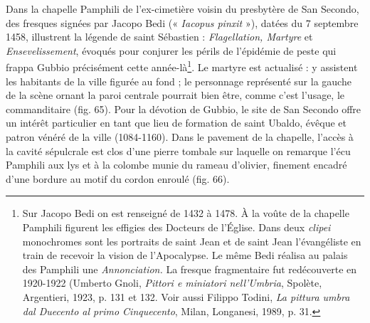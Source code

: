 \documentclass[12pt,twoside,openany]{book}
\begin{document}
Dans la chapelle Pamphili de l’ex-cimetière voisin du presbytère de San Secondo, des fresques signées par Jacopo Bedi (« \textit{Iacopus pinxit} »), datées du 7 septembre 1458, illustrent la légende de saint Sébastien :\textit{ Flagellation, Martyre }et \textit{Ensevelissement}, évoqués pour conjurer les périls de l’épidémie de peste qui frappa Gubbio précisément cette année-là\footnote{Sur Jacopo Bedi on est renseigné de 1432 à 1478. À la voûte de la chapelle Pamphili figurent les effigies des Docteurs de l’Église. Dans deux \textit{clipei} monochromes sont les portraits de saint Jean et de saint Jean l’évangéliste en train de recevoir la vision de l’Apocalypse. Le même Bedi réalisa au palais des Pamphili une \textit{Annonciation. }La fresque fragmentaire fut redécouverte en 1920-1922 (Umberto Gnoli, \textit{Pittori e miniatori nell'Umbria}, Spolète, Argentieri, 1923, p. 131 et 132. Voir aussi Filippo Todini, \textit{La pittura umbra dal Duecento al primo Cinquecento}, Milan, Longanesi, 1989, p. 31.}. Le martyre est actualisé : y assistent les habitants de la ville figurée au fond ; le personnage représenté sur la gauche de la scène ornant la paroi centrale pourrait bien être, comme c’est l’usage, le commanditaire (fig. 65). Pour la dévotion de Gubbio, le site de San Secondo offre un intérêt particulier en tant que lieu de formation de saint Ubaldo, évêque et patron vénéré de la ville (1084-1160). Dans le pavement de la chapelle, l’accès à la cavité sépulcrale est clos d’une pierre tombale sur laquelle on remarque l’écu Pamphili aux lys et à la colombe munie du rameau d’olivier, finement encadré d’une bordure au motif du cordon enroulé (fig. 66).
\end{document}
